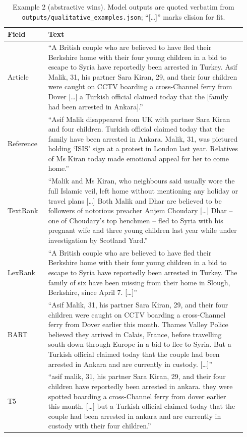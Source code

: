 \begin{table}[H]
\centering
\caption{Example 2 (abstractive wins). Model outputs are quoted verbatim from \texttt{outputs/qualitative\_examples.json}; ``[\dots]'' marks elision for fit.}
\small
\begin{tabular}{p{0.16\linewidth} p{0.78\linewidth}}
\toprule
\textbf{Field} & \textbf{Text} \\
\midrule
Article & ``A British couple who are believed to have fled their Berkshire home with their four young children in a bid to escape to Syria have reportedly been arrested in Turkey. Asif Malik, 31, his partner Sara Kiran, 29, and their four children were caught on CCTV boarding a cross-Channel ferry from Dover [\dots] a Turkish official claimed today that the [family had been arrested in Ankara].'' \\
Reference & ``Asif Malik disappeared from UK with partner Sara Kiran and four children. Turkish official claimed today that the family have been arrested in Ankara. Malik, 31, was pictured holding `ISIS' sign at a protest in London last year. Relatives of Ms Kiran today made emotional appeal for her to come home.'' \\
TextRank & ``Malik and Ms Kiran, who neighbours said usually wore the full Islamic veil, left home without mentioning any holiday or travel plans [\dots] Both Malik and Dhar are believed to be followers of notorious preacher Anjem Choudary [\dots] Dhar -- one of Choudary's top henchmen -- fled to Syria with his pregnant wife and three young children last year while under investigation by Scotland Yard.'' \\
LexRank & ``A British couple who are believed to have fled their Berkshire home with their four young children in a bid to escape to Syria have reportedly been arrested in Turkey. The family of six have been missing from their home in Slough, Berkshire, since April 7. [\dots]'' \\
BART & ``Asif Malik, 31, his partner Sara Kiran, 29, and their four children were caught on CCTV boarding a cross-Channel ferry from Dover earlier this month. Thames Valley Police believed they arrived in Calais, France, before travelling south down through Europe in a bid to flee to Syria. But a Turkish official claimed today that the couple had been arrested in Ankara and are currently in custody. [\dots]'' \\
T5 & ``asif malik, 31, his partner Sara Kiran, 29, and their four children have reportedly been arrested in ankara. they were spotted boarding a cross-Channel ferry from dover earlier this month. [\dots] but a Turkish official claimed today that the couple had been arrested in ankara and are currently in custody with their four children.'' \\
\bottomrule
\end{tabular}
\end{table}

